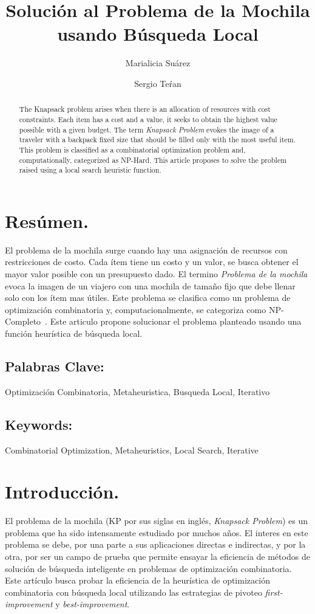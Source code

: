 \documentclass{ci5652}
\title{Solución al Problema de la Mochila usando Búsqueda Local}
\author{Marialicia Suárez
        \and
        Sergio Teŕan}
\begin{document}
\thispagestyle{empty}
\maketitle


\section*{Resúmen.}
	El problema de la mochila surge cuando hay una asignación de recursos con restricciones de costo. Cada ítem tiene un costo y un valor, se busca obtener el mayor valor posible con un presupuesto dado. El termino \textit{Problema de la mochila} evoca la imagen de un viajero con una mochila de tamaño fijo que debe llenar solo con los ítem mas útiles. Este problema se clasifica como un problema de optimización combinatoria y, computacionalmente, se categoriza como NP-Completo~\cite{c_resumen_01}. Este articulo propone solucionar el problema planteado usando una función heurística de búsqueda local.

	\subsection*{Palabras Clave:}
	Optimización Combinatoria, Metaheuristica, Busqueda Local, Iterativo 

\begin{abstract}
	The Knapsack problem arises when there is an allocation of resources with cost constraints. Each item has a cost and a value, it seeks to obtain the highest value possible with a given budget. The term \textit{Knapsack Problem} evokes the image of a traveler with a backpack fixed size that should be filled only with the most useful item. This problem is classified as a combinatorial optimization problem and, computationally, categorized as NP-Hard. This article proposes to solve the problem raised using a local search heuristic function.
\end{abstract}

	\subsection*{Keywords:}
	Combinatorial Optimization, Metaheuristics, Local Search, Iterative

\section{Introducción.}

	El problema de la mochila (KP por sus siglas en inglés, \textit{Knapsack Problem}) es un problema que ha sido intensamente estudiado por muchos años. El interes en este problema se debe, por una parte a sus aplicaciones directas e indirectas, y por la otra, por ser un campo de prueba que permite ensayar la eficiencia de métodos de solución de búsqueda inteligente en problemas de optimización combinatoria. \\
	Este artículo busca probar la eficiencia de la heurística de optimización combinatoria con búsqueda local utilizando las estrategias de pivoteo \textit{first-improvement} y \textit{best-improvement}.
\end{document}
